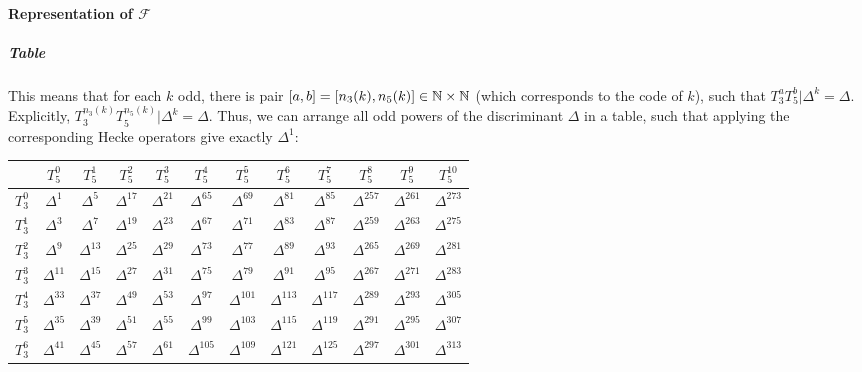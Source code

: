 \paragraph{Representation of $\mathcal{F}$}
\subparagraph{Table}
This means that for each $k$ odd, there is pair $\left[ a,b \right] = \left[ n_3(k),n_5(k) \right] \in \mathbb{N}\times\mathbb{N}$ (which corresponds to the code of $k$), such that $T_3^aT_5^b|\Delta^k = \Delta$.
Explicitly, $T_3^{n_3(k)}T_5^{n_5(k)}|\Delta^k = \Delta$.
Thus, we can arrange all odd powers of the discriminant $\Delta$ in a table, such that applying the corresponding Hecke operators give exactly $\Delta^1$:
\begin{center}
	\begin{tabular}{|c||ccccccccccc|}
		\hline
		\textbf{} & \textbf{$T_5^{0}$} & \textbf{$T_5^{1}$} & \textbf{$T_5^{2}$} & \textbf{$T_5^{3}$} & \textbf{$T_5^{4}$} & \textbf{$T_5^{5}$} & \textbf{$T_5^{6}$} & \textbf{$T_5^{7}$} & \textbf{$T_5^{8}$} & \textbf{$T_5^{9}$} & \textbf{$T_5^{10}$} \\
		\hline\hline
		$T_3^{0}$ & $\Delta^{1}$ & $\Delta^{5}$ & $\Delta^{17}$ & $\Delta^{21}$ & $\Delta^{65}$ & $\Delta^{69}$ & $\Delta^{81}$ & $\Delta^{85}$ & $\Delta^{257}$ & $\Delta^{261}$ & $\Delta^{273}$ \\
		$T_3^{1}$ & $\Delta^{3}$ & $\Delta^{7}$ & $\Delta^{19}$ & $\Delta^{23}$ & $\Delta^{67}$ & $\Delta^{71}$ & $\Delta^{83}$ & $\Delta^{87}$ & $\Delta^{259}$ & $\Delta^{263}$ & $\Delta^{275}$ \\
		$T_3^{2}$ & $\Delta^{9}$ & $\Delta^{13}$ & $\Delta^{25}$ & $\Delta^{29}$ & $\Delta^{73}$ & $\Delta^{77}$ & $\Delta^{89}$ & $\Delta^{93}$ & $\Delta^{265}$ & $\Delta^{269}$ & $\Delta^{281}$ \\
		$T_3^{3}$ & $\Delta^{11}$ & $\Delta^{15}$ & $\Delta^{27}$ & $\Delta^{31}$ & $\Delta^{75}$ & $\Delta^{79}$ & $\Delta^{91}$ & $\Delta^{95}$ & $\Delta^{267}$ & $\Delta^{271}$ & $\Delta^{283}$ \\
		$T_3^{4}$ & $\Delta^{33}$ & $\Delta^{37}$ & $\Delta^{49}$ & $\Delta^{53}$ & $\Delta^{97}$ & $\Delta^{101}$ & $\Delta^{113}$ & $\Delta^{117}$ 
		& $\Delta^{289}$ & $\Delta^{293}$ & $\Delta^{305}$ \\
		$T_3^{5}$ & $\Delta^{35}$ & $\Delta^{39}$ & $\Delta^{51}$ & $\Delta^{55}$ & $\Delta^{99}$ & $\Delta^{103}$ & $\Delta^{115}$ & $\Delta^{119}$ 
		& $\Delta^{291}$ & $\Delta^{295}$ & $\Delta^{307}$ \\
		$T_3^{6}$ & $\Delta^{41}$ & $\Delta^{45}$ & $\Delta^{57}$ & $\Delta^{61}$ & $\Delta^{105}$ & $\Delta^{109}$ & $\Delta^{121}$ & $\Delta^{125}$ & $\Delta^{297}$ & $\Delta^{301}$ & $\Delta^{313}$ \\

\end{tabular}
\end{center}
